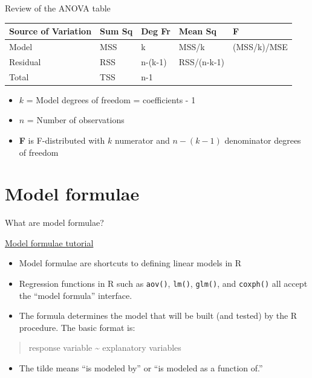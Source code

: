 \documentclass[
  ignorenonframetext,
]{beamer}
\providecommand{\tightlist}{%
  \setlength{\itemsep}{0pt}\setlength{\parskip}{0pt}}
\begin{document}
\begin{frame}{Review of the ANOVA table}
\protect\hypertarget{review-of-the-anova-table}{}

\begin{longtable}[]{@{}lllll@{}}
\toprule
Source of Variation & Sum Sq & Deg Fr & Mean Sq & F\tabularnewline
\midrule
\endhead
Model & MSS & k & MSS/k & (MSS/k)/MSE\tabularnewline
Residual & RSS & n-(k-1) & RSS/(n-k-1) &\tabularnewline
Total & TSS & n-1 & &\tabularnewline
\bottomrule
\end{longtable}

\begin{itemize}
\tightlist
\item
  \(k\) = Model degrees of freedom = coefficients - 1
\item
  \(n\) = Number of observations
\item
  \textbf{F} is F-distributed with \(k\) numerator and \(n-(k-1)\)
  denominator degrees of freedom
\end{itemize}

\end{frame}

\hypertarget{model-formulae}{%
\section{Model formulae}\label{model-formulae}}

\begin{frame}[fragile]{What are model formulae?}
\protect\hypertarget{what-are-model-formulae}{}

\href{http://ww2.coastal.edu/kingw/statistics/R-tutorials/formulae.html}{Model
formulae tutorial}

\begin{itemize}
\tightlist
\item
  Model formulae are shortcuts to defining linear models in R
\item
  Regression functions in R such as \texttt{aov()}, \texttt{lm()},
  \texttt{glm()}, and \texttt{coxph()} all accept the ``model formula''
  interface.
\item
  The formula determines the model that will be built (and tested) by
  the R procedure. The basic format is:
\end{itemize}

\begin{quote}
response variable \textasciitilde{} explanatory variables
\end{quote}

\begin{itemize}
\tightlist
\item
  The tilde means ``is modeled by'' or ``is modeled as a function of.''
\end{itemize}

\end{frame}
\end{document}

